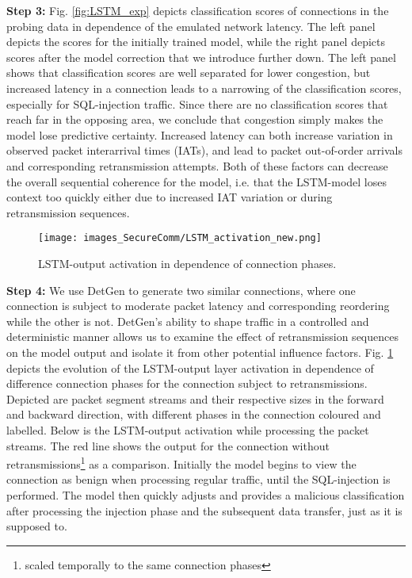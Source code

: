 \textbf{Step 3:} Fig. \ref{fig:LSTM_exp} depicts classification scores of connections in the probing data in dependence of the emulated network latency. The left panel depicts the scores for the initially trained model, while the right panel depicts scores after the model correction that we introduce further down. 
The left panel shows that classification scores are well separated for lower congestion, but increased latency in a connection leads to a narrowing of the classification scores, especially for SQL-injection traffic. Since there are no classification scores that reach far in the opposing area, we conclude that congestion simply makes the model lose predictive certainty. 
Increased latency can both increase variation in observed packet interarrival times (IATs), and lead to packet out-of-order arrivals and corresponding retransmission attempts. Both of these factors can decrease the overall sequential coherence for the model, i.e. that the LSTM-model loses context too quickly either due to increased IAT variation or during retransmission sequences. 


\begin{figure}
\centering
\texttt{[image: images\_SecureComm/LSTM\_activation\_new.png]}
\caption{LSTM-output activation in dependence of connection phases.}\label{fig:LSTM_act}
\end{figure}

\textbf{Step 4:} We use DetGen to generate two similar connections, where one connection is subject to moderate packet latency and corresponding reordering while the other is not. DetGen's ability to shape traffic in a controlled and deterministic manner allows us to examine the effect of retransmission sequences on the model output and isolate it from other potential influence factors. 
Fig. \ref{fig:LSTM_act} depicts the evolution of the LSTM-output layer activation in dependence of difference connection phases for the connection subject to retransmissions. Depicted are packet segment streams and their respective sizes in the forward and backward direction, with different phases in the connection coloured and labelled. Below is the LSTM-output activation while processing the packet streams. The red line shows the output for the connection without retransmissions\footnote{scaled temporally to the same connection phases} as a comparison.
Initially the model begins to view the connection as benign when processing regular traffic, until the SQL-injection is performed. The model then quickly adjusts and provides a malicious classification after processing the injection phase and the subsequent data transfer, just as it is supposed to. 

